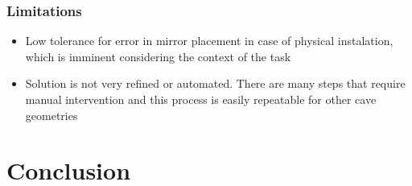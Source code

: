 \documentclass[11pt, letterpaper]{article}
\begin{document}
\subsubsection{Limitations}
\begin{itemize}


\item Low tolerance for error in mirror placement in case of physical instalation, which is imminent considering the context of the task

\item Solution is not very refined or automated. There are many steps that require manual intervention and this process is easily repeatable for other cave geometries

\end{itemize}
\section{Conclusion}


 \newpage
 
 
\end{document}
